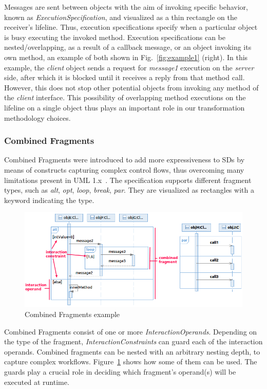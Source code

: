 \documentclass[letter]{llncs}
\newcommand{\figshrink}{\vspace{-.6cm}}
\newcommand{\figshrinkend}{}
\newcommand{\subsecshrinkbegin}{\vspace{-.2cm}}
\begin{document}
Messages are sent between objects with the aim of invoking specific behavior, known as
\emph{ExecutionSpecification}, and visualized as a thin rectangle on the receiver's lifeline. Thus,
execution specifications specify when a particular object is busy executing the invoked method.
Execution specifications can be nested/overlapping, as a result of a callback message, or 
an object invoking its own method, an example of both shown in Fig.~\ref{fig:example1} (right).
In this example,
the \emph{client} object sends a request for \emph{message1} execution on the \emph{server} side, after which 
it is blocked until it receives a reply from that method call. However, this does not stop other potential objects
from invoking any method of the \emph{client} interface. This possibility of overlapping method executions
on the lifeline on a single object thus plays an important role in our transformation methodology choices.
\vspace{-16 pt}
\subsecshrinkbegin
\subsubsection{Combined Fragments}
\label{sec:CombinedFragments}
Combined Fragments were introduced to add more expressiveness to SDs by 
means of constructs capturing complex control flows, thus overcoming many limitations 
present in UML 1.x~\cite{UML2.4}. The specification supports different fragment types,
such as \emph{alt}, \emph{opt}, \emph{loop}, \emph{break}, \emph{par}.
They are visualized as rectangles with a keyword
indicating the type.
\begin{figure}[!t]
\centering
\includegraphics[width=1.0\linewidth,keepaspectratio=true]{./Figure2_merged.png}
\caption{Combined Fragments example}
\label{fig:example3}
\figshrinkend
\end{figure}
Combined Fragments consist of one or more \emph{InteractionOperands}. Depending on the type
of the fragment, \emph{InteractionConstraints} can guard each of the interaction operands.
Combined fragments can be nested with an arbitrary nesting depth, to capture complex workflows. Figure~\ref{fig:example3}
shows how some of them can be used. The guards play a crucial role in deciding which fragment's operand(s) will
be executed at runtime.
\end{document}
